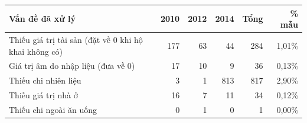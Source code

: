 \begin{tabular}{lrrrrr}
\toprule
Vấn đề đã xử lý & 2010 & 2012 & 2014 & Tổng & \% mẫu \\
\midrule
Thiếu giá trị tài sản (đặt về 0 khi hộ khai không có) & 177 & 63 & 44 & 284 & 1,01\% \\
Giá trị âm do nhập liệu (đưa về 0) & 17 & 10 & 9 & 36 & 0,13\% \\
Thiếu chi nhiên liệu & 3 & 1 & 813 & 817 & 2,90\% \\
Thiếu giá trị nhà ở & 16 & 7 & 11 & 34 & 0,12\% \\
Thiếu chi ngoài ăn uống & 0 & 1 & 0 & 1 & 0,00\% \\
\bottomrule
\end{tabular}
